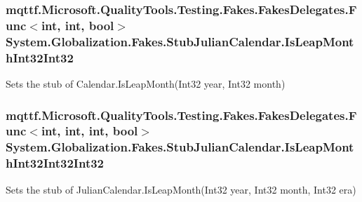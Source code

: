 \hypertarget{class_system_1_1_globalization_1_1_fakes_1_1_stub_julian_calendar_a2edcc00e00a820c113307bdb1d6c9777}{
\subsubsection[{Is\-Leap\-Month\-Int32\-Int32}]{\setlength{\rightskip}{0pt plus 5cm}mqttf.\-Microsoft.\-Quality\-Tools.\-Testing.\-Fakes.\-Fakes\-Delegates.\-Func$<$int, int, bool$>$ System.\-Globalization.\-Fakes.\-Stub\-Julian\-Calendar.\-Is\-Leap\-Month\-Int32\-Int32}}\label{class_system_1_1_globalization_1_1_fakes_1_1_stub_julian_calendar_a2edcc00e00a820c113307bdb1d6c9777}


Sets the stub of Calendar.\-Is\-Leap\-Month(\-Int32 year, Int32 month)

\hypertarget{class_system_1_1_globalization_1_1_fakes_1_1_stub_julian_calendar_a53b5cff1d67f7c67dfa61dc92933f5c5}{
\subsubsection[{Is\-Leap\-Month\-Int32\-Int32\-Int32}]{\setlength{\rightskip}{0pt plus 5cm}mqttf.\-Microsoft.\-Quality\-Tools.\-Testing.\-Fakes.\-Fakes\-Delegates.\-Func$<$int, int, int, bool$>$ System.\-Globalization.\-Fakes.\-Stub\-Julian\-Calendar.\-Is\-Leap\-Month\-Int32\-Int32\-Int32}}\label{class_system_1_1_globalization_1_1_fakes_1_1_stub_julian_calendar_a53b5cff1d67f7c67dfa61dc92933f5c5}


Sets the stub of Julian\-Calendar.\-Is\-Leap\-Month(\-Int32 year, Int32 month, Int32 era)

